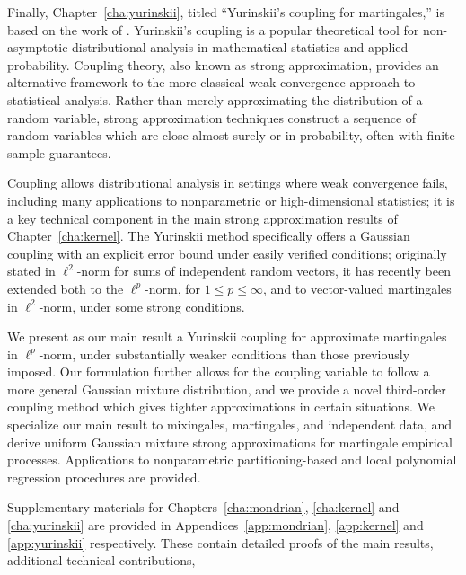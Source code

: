 Finally, Chapter~\ref{cha:yurinskii}, titled ``Yurinskii's coupling for
martingales,'' is based on the work of \cite{cattaneo2022yurinskii}.
Yurinskii's coupling is a popular theoretical tool for non-asymptotic
distributional analysis in mathematical statistics and applied probability.
Coupling theory, also known as strong approximation, provides an
alternative framework to the more classical weak convergence approach
to statistical analysis. Rather
than merely approximating the distribution of a random variable, strong
approximation techniques construct a sequence of random variables
which are close almost surely or in probability, often with
finite-sample guarantees.

Coupling allows distributional analysis in settings where weak convergence fails,
including many applications to nonparametric or high-dimensional statistics;
it is a key technical component in the main strong approximation results
of Chapter~\ref{cha:kernel}. The Yurinskii method
specifically offers a Gaussian coupling
with an explicit error bound under easily verified conditions; originally
stated in $\ell^2$-norm for sums of independent random vectors, it has recently
been extended both to the $\ell^p$-norm, for $1 \leq p \leq \infty$, and to
vector-valued martingales in $\ell^2$-norm, under some strong conditions.

We present as our main result a Yurinskii coupling for approximate martingales
in $\ell^p$-norm, under substantially weaker conditions than those previously
imposed. Our formulation further allows for the coupling variable to follow a
more general Gaussian mixture distribution, and we provide a novel third-order
coupling method which gives tighter approximations in certain situations. We
specialize our main result to mixingales, martingales, and independent data,
and derive uniform Gaussian mixture strong approximations for martingale
empirical processes. Applications to nonparametric partitioning-based and local
polynomial regression procedures are provided.

Supplementary materials for
Chapters~\ref{cha:mondrian}, \ref{cha:kernel} and \ref{cha:yurinskii}
are provided in Appendices~\ref{app:mondrian}, \ref{app:kernel}
and \ref{app:yurinskii} respectively.
These contain detailed proofs of the main results, additional technical
contributions,

